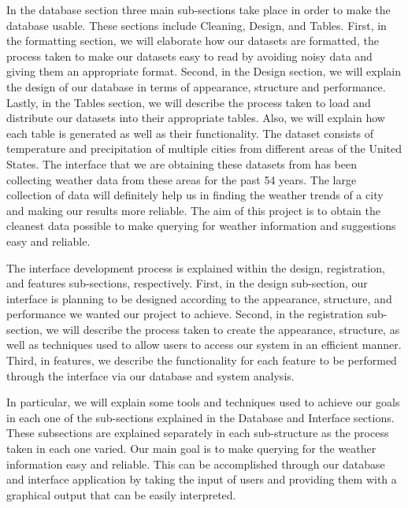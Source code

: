 \documentclass{sig-alternate}
\begin{document}
In the database section three main sub-sections take place in order to make the database usable. These sections include Cleaning, Design, and Tables. First, in the formatting section, we will elaborate how our datasets are formatted, the process taken to make our datasets easy to read by avoiding noisy data and giving them an appropriate format. Second, in the Design section, we will explain the design of our database in terms of appearance, structure and performance. Lastly, in the Tables section, we will describe the process taken to load and distribute our datasets into their appropriate tables. Also, we will explain how each table is generated as well as their functionality. The dataset consists of temperature and precipitation of multiple cities from different areas of the United States. The interface that we are obtaining these datasets from has been collecting weather data from these areas for the past 54 years. The large collection of data will definitely help us in finding the weather trends of a city and making our results more reliable. The aim of this project is to obtain the cleanest data possible to make querying for weather information and suggestions easy and reliable.\newline
    
The interface development process is explained within the design, registration, and features sub-sections, respectively. First, in the design sub-section, our interface is planning to be designed according to the appearance, structure, and performance we wanted our project to achieve. Second, in the registration sub-section, we will describe the process taken to create the appearance, structure, as well as techniques used to allow users to access our system in an efficient manner. Third, in features, we describe the functionality for each feature to be performed through the interface via our database and system analysis.\newline

In particular, we will explain some tools and techniques used to achieve our goals in each one of the sub-sections explained in the Database and Interface sections. These subsections are explained separately in each sub-structure as the process taken in each one varied. Our main goal is to make querying for the weather information easy and reliable. This can be accomplished through our database and interface application by taking the input of users and providing them with a graphical output that can be easily interpreted.\newline
\end{document}
